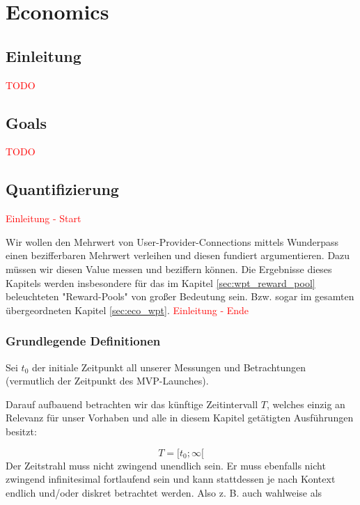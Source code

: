 \documentclass[11pt]{scrartcl}
\newcommand\todo[1]{\textcolor{red}{#1}}
\begin{document}
\section{Economics}
\label{sec:economics}


\subsection{Einleitung}
\label{sec:eco_einleitung}
\todo{TODO}



\subsection{Goals}
\label{sec:eco_goals}
\todo{TODO}



\subsection{Quantifizierung}
\label{sec:eco_zahlen}
\todo{Einleitung - Start}

Wir wollen den Mehrwert von User-Provider-Connections mittels Wunderpass einen bezifferbaren Mehrwert verleihen und diesen fundiert argumentieren. Dazu müssen wir diesen Value messen und beziffern können. Die Ergebnisse dieses Kapitels werden insbesondere für das im Kapitel \ref{sec:wpt_reward_pool} beleuchteten "Reward-Pools" von großer Bedeutung sein. Bzw. sogar im gesamten übergeordneten Kapitel \ref{sec:eco_wpt}.
\todo{Einleitung - Ende}

\subsubsection{Grundlegende Definitionen}
\label{sec:eco_zahlen_def}


Sei $t_0$ der initiale Zeitpunkt all unserer Messungen und Betrachtungen (vermutlich der Zeitpunkt des MVP-Launches).

Darauf aufbauend betrachten wir das künftige Zeitintervall $T$, welches einzig an Relevanz für unser Vorhaben und alle in diesem Kapitel getätigten Ausführungen besitzt:

\begin{equation*}
  T = [t_0; \infty[
\end{equation*}
Der Zeitstrahl muss nicht zwingend unendlich sein. Er muss ebenfalls nicht zwingend infinitesimal fortlaufend sein und kann stattdessen je nach Kontext endlich und/oder diskret betrachtet werden. Also z. B. auch wahlweise als 
\end{document}
